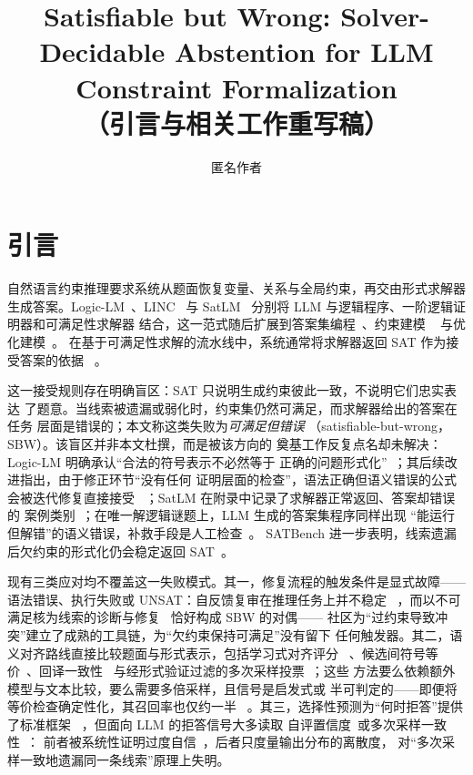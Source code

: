 \documentclass[letterpaper]{article}
\title{Satisfiable but Wrong: Solver-Decidable Abstention for LLM Constraint Formalization\\
\normalsize（引言与相关工作重写稿）}
\author{匿名作者}
\newcommand{\sbw}{SBW}
\begin{document}
\maketitle

\section{引言}
\label{sec:intro}

自然语言约束推理要求系统从题面恢复变量、关系与全局约束，再交由形式求解器
生成答案。Logic-LM~\cite{pan2023}、LINC~\cite{olausson2023} 与
SatLM~\cite{ye2023} 分别将 LLM 与逻辑程序、一阶逻辑证明器和可满足性求解器
结合，这一范式随后扩展到答案集编程~\cite{ishay2023}、约束建模
~\cite{tsouros2023,michailidis2024} 与优化建模~\cite{ahmaditeshnizi2024}。
在基于可满足性求解的流水线中，系统通常将求解器返回 SAT 作为接受答案的依据
~\cite{pan2023,ye2023}。

这一接受规则存在明确盲区：SAT 只说明生成约束彼此一致，不说明它们忠实表达
了题意。当线索被遗漏或弱化时，约束集仍然可满足，而求解器给出的答案在任务
层面是错误的；本文称这类失败为\emph{可满足但错误}
（satisfiable-but-wrong，\sbw{}）。该盲区并非本文杜撰，而是被该方向的
奠基工作反复点名却未解决：Logic-LM 明确承认``合法的符号表示不必然等于
正确的问题形式化''~\cite{pan2023}；其后续改进指出，由于修正环节``没有任何
证明层面的检查''，语法正确但语义错误的公式会被迭代修复直接接受
~\cite{kirtania2024}；SatLM 在附录中记录了求解器正常返回、答案却错误的
案例类别~\cite{ye2023}；在唯一解逻辑谜题上，LLM 生成的答案集程序同样出现
``能运行但解错''的语义错误，补救手段是人工检查~\cite{ishay2023}。
SATBench 进一步表明，线索遗漏后欠约束的形式化仍会稳定返回
SAT~\cite{wei2025}。

现有三类应对均不覆盖这一失败模式。其一，修复流程的触发条件是显式故障——
语法错误、执行失败或 UNSAT：自反馈复审在推理任务上并不稳定
~\cite{madaan2023,huang2024}，而以不可满足核为线索的诊断与修复
~\cite{liffiton2008,chen2024optichat,singh2026}恰好构成 \sbw{} 的对偶——
社区为``过约束导致冲突''建立了成熟的工具链，为``欠约束保持可满足''没有留下
任何触发器。其二，语义对齐路线直接比较题面与形式表示，包括学习式对齐评分
~\cite{lu2025}、候选间符号等价~\cite{li2024symbolic,ryu2025}、回译一致性
~\cite{ying2024}与经形式验证过滤的多次采样投票~\cite{zhou2024dtv}；这些
方法要么依赖额外模型与文本比较，要么需要多倍采样，且信号是启发式或
半可判定的——即便将等价检查确定性化，其召回率也仅约一半
~\cite{poiroux2025}。其三，选择性预测为``何时拒答''提供了标准框架
~\cite{chow1957,geifman2017,kamath2020}，但面向 LLM 的拒答信号大多读取
自评置信度~\cite{xiong2024}或多次采样一致性~\cite{wang2023,farquhar2024}：
前者被系统性证明过度自信~\cite{xiong2024}，后者只度量输出分布的离散度，
对``多次采样一致地遗漏同一条线索''原理上失明。
\end{document}
